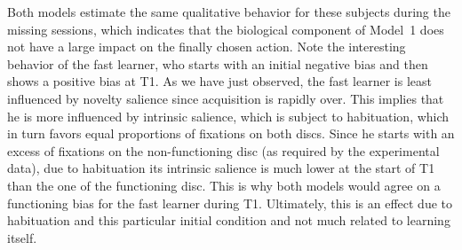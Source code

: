 \documentclass[a4paper]{scrreprt}
\begin{document}
Both models estimate the same qualitative behavior for these subjects during the missing sessions, which indicates that the biological component of Model~1 does not have a large impact on the finally chosen action. Note the interesting behavior of the fast learner, who starts with an initial negative bias and then shows a positive bias at T1. As we have just observed, the fast learner is least influenced by novelty salience since acquisition is rapidly over. This implies that he is more influenced by intrinsic salience, which is subject to habituation, which in turn favors equal proportions of fixations on both discs. Since he starts with an excess of fixations on the non-functioning disc (as required by the experimental data), due to habituation its intrinsic salience is much lower at the start of T1 than the one of the functioning disc. This is why both models would agree on a functioning bias for the fast learner during T1. Ultimately, this is an effect due to habituation and this particular initial condition and not much related to learning itself.
\end{document}
